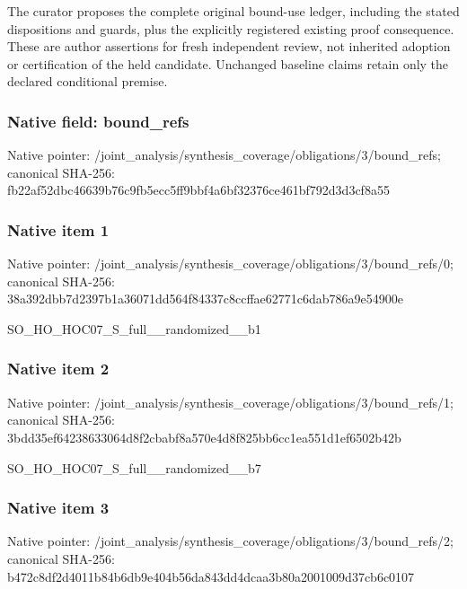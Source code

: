 \documentclass[10pt,a4paper]{article}
\begin{document}
\begingroup\raggedright\sloppy The curator proposes the complete original bound-use ledger,\allowbreak{} including the stated dispositions and guards,\allowbreak{} plus the explicitly registered existing proof consequence. These are author assertions for fresh independent review,\allowbreak{} not inherited adoption or certification of the held candidate. Unchanged baseline claims retain only the declared conditional premise.\par\endgroup

\subsubsection{Native field: bound\_\allowbreak{}refs}
Native pointer: /joint\_\allowbreak{}analysis/synthesis\_\allowbreak{}coverage/obligations/3/bound\_\allowbreak{}refs; canonical SHA-256: fb22af52dbc46639b76c9fb5ecc5ff9bbf4a6bf32376ce461bf792d3d3cf8a55

\subsubsection{Native item 1}
Native pointer: /joint\_\allowbreak{}analysis/synthesis\_\allowbreak{}coverage/obligations/3/bound\_\allowbreak{}refs/0; canonical SHA-256: 38a392dbb7d2397b1a36071dd564f84337c8ccffae62771c6dab786a9e54900e

\begingroup\raggedright\sloppy SO\_\allowbreak{}HO\_\allowbreak{}HOC07\_\allowbreak{}S\_\allowbreak{}full\_\allowbreak{}\_\allowbreak{}randomized\_\allowbreak{}\_\allowbreak{}b1\par\endgroup

\subsubsection{Native item 2}
Native pointer: /joint\_\allowbreak{}analysis/synthesis\_\allowbreak{}coverage/obligations/3/bound\_\allowbreak{}refs/1; canonical SHA-256: 3bdd35ef64238633064d8f2cbabf8a570e4d8f825bb6cc1ea551d1ef6502b42b

\begingroup\raggedright\sloppy SO\_\allowbreak{}HO\_\allowbreak{}HOC07\_\allowbreak{}S\_\allowbreak{}full\_\allowbreak{}\_\allowbreak{}randomized\_\allowbreak{}\_\allowbreak{}b7\par\endgroup

\subsubsection{Native item 3}
Native pointer: /joint\_\allowbreak{}analysis/synthesis\_\allowbreak{}coverage/obligations/3/bound\_\allowbreak{}refs/2; canonical SHA-256: b472c8df2d4011b84b6db9e404b56da843dd4dcaa3b80a2001009d37cb6c0107
\end{document}
